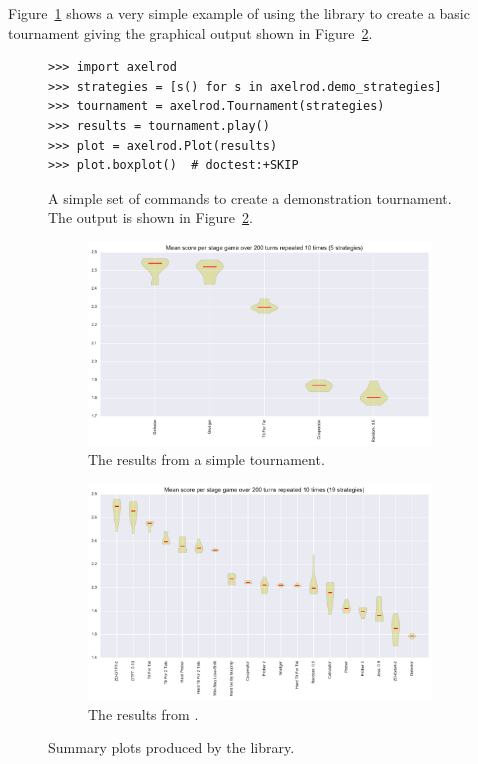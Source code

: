 \documentclass{article}
\begin{document}
Figure~\ref{fig:demo_tournament_commands} shows a very simple example of using
the library to create a basic tournament giving the graphical output shown in
Figure~\ref{fig:demo_tournament}.

\begin{figure}[!hbtp]
    \begin{verbatim}
>>> import axelrod
>>> strategies = [s() for s in axelrod.demo_strategies]
>>> tournament = axelrod.Tournament(strategies)
>>> results = tournament.play()
>>> plot = axelrod.Plot(results)
>>> plot.boxplot()  # doctest:+SKIP
    \end{verbatim}
    \caption{A simple set of commands to create a demonstration tournament. The
        output is shown in Figure~\ref{fig:demo_tournament}.}
    \label{fig:demo_tournament_commands}
\end{figure}

\begin{figure}[!hbtp]
	\begin{subfigure}{.5\textwidth}
		\centering
		\includegraphics[width=\textwidth]{../img/demo_tournament.pdf}
		\caption{The results from a simple tournament.}
		\label{fig:demo_tournament}
	\end{subfigure}
	\begin{subfigure}{.5\textwidth}
		\centering
		\includegraphics[width=\textwidth]{../img/stewart_tournament.pdf}
		\caption{The results from \cite{Stewart2012}.}
		\label{fig:stewart_tournament}
	\end{subfigure}
	\caption{Summary plots produced by the library.}
\end{figure}
\end{document}
